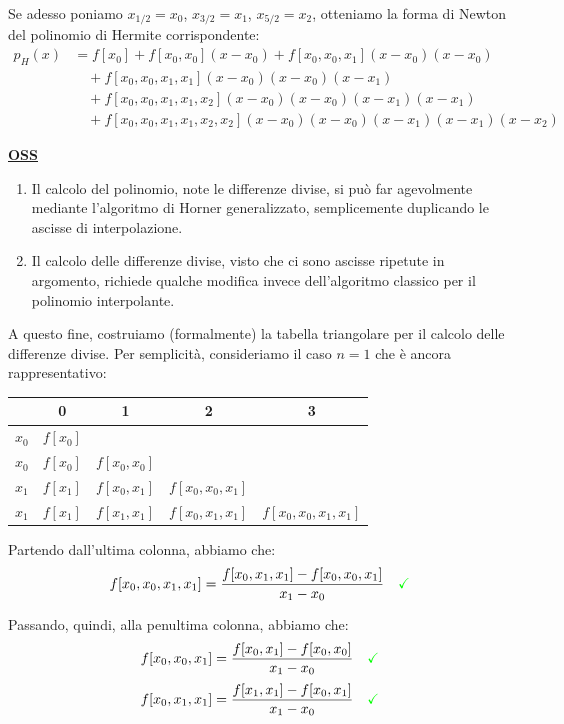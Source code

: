 Se adesso poniamo $x_{1/2} = x_0$, $x_{3/2} = x_1$, $x_{5/2} = x_2$, otteniamo la forma di Newton del polinomio di Hermite corrispondente:
\begin{align*}
    p_H(x) &= f[x_0] + f[x_0, x_0](x-x_0) + f[x_0, x_0, x_1](x-x_0)(x-x_0) \\
    &\quad + f[x_0, x_0, x_1, x_1](x-x_0)(x-x_0)(x-x_1) \\
    &\quad + f[x_0, x_0, x_1, x_1, x_2](x-x_0)(x-x_0)(x-x_1)(x-x_1) \\
    &\quad + f[x_0, x_0, x_1, x_1, x_2, x_2](x-x_0)(x-x_0)(x-x_1)(x-x_1)(x-x_2)
    \end{align*}

\underline{\textbf{OSS}}
\begin{enumerate}
    \item Il calcolo del polinomio, note le differenze divise, si può far agevolmente mediante l'algoritmo di Horner generalizzato, semplicemente duplicando le ascisse di interpolazione.
    \item Il calcolo delle differenze divise, visto che ci sono ascisse ripetute in argomento, richiede qualche modifica invece dell'algoritmo classico per il polinomio interpolante.
\end{enumerate}

A questo fine, costruiamo (formalmente) la tabella triangolare per il calcolo delle differenze divise. Per semplicità, consideriamo il caso $n=1$ che è ancora rappresentativo:

\begin{center}
\renewcommand{\arraystretch}{1.5}
\begin{tabular}{c|cccc}
 & 0 & 1 & 2 & 3 \\
\hline
$x_0$ & $f[x_0]$ & & & \\
$x_0$ & $f[x_0]$ & $f[x_0, x_0]$ & & \\
$x_1$ & $f[x_1]$ & $f[x_0, x_1]$ & $f[x_0, x_0, x_1]$ & \\
$x_1$ & $f[x_1]$ & $f[x_1, x_1]$ & $f[x_0, x_1, x_1]$ & $f[x_0, x_0, x_1, x_1]$ \\
\end{tabular}
\end{center}

Partendo dall'ultima colonna, abbiamo che:
$$ f[x_0, x_0, x_1, x_1] = \frac{f[x_0, x_1, x_1] - f[x_0, x_0, x_1]}{x_1 - x_0} \quad \text{\textcolor{green}{\checkmark}} $$

Passando, quindi, alla penultima colonna, abbiamo che:
$$ f[x_0, x_0, x_1] = \frac{f[x_0, x_1] - f[x_0, x_0]}{x_1 - x_0} \quad \text{\textcolor{green}{\checkmark}} $$
$$ f[x_0, x_1, x_1] = \frac{f[x_1, x_1] - f[x_0, x_1]}{x_1 - x_0} \quad \text{\textcolor{green}{\checkmark}} $$

